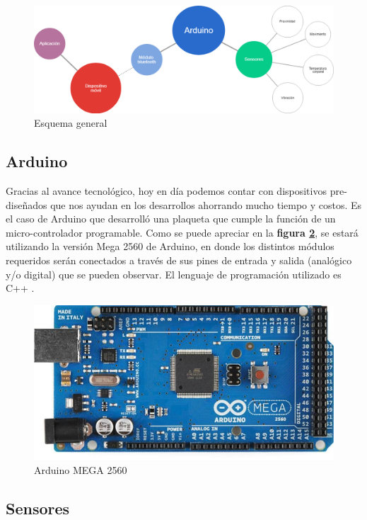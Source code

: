 \documentclass{IEEEtran}
\begin{document}
			\begin{figure}
				\centering
				\includegraphics[width=1\linewidth]{esquemageneral}
				\caption{Esquema general}
				\label{esquemageneral}
			\end{figure}

		\subsection{Arduino}

			Gracias al avance tecnológico, hoy en día podemos contar con dispositivos pre-diseñados que nos ayudan en los desarrollos ahorrando mucho tiempo y costos. Es el caso de Arduino \cite{arduinourl} que desarrolló una plaqueta que cumple la función de un micro-controlador programable.
			Como se puede apreciar en la \textbf{figura \ref{arduino-mega}}, se estará utilizando la versión Mega 2560 de Arduino, en donde los distintos módulos requeridos serán conectados a través de sus pines de entrada y salida (analógico y/o digital) que se pueden observar. El lenguaje de programación utilizado es C++ \cite{arduinocode}. 

			\begin{figure}
				\centering
				\includegraphics[width=0.8\linewidth]{arduino-mega}
				\caption{Arduino MEGA 2560}
				\label{arduino-mega}
			\end{figure}

		\subsection{Sensores}
\end{document}
